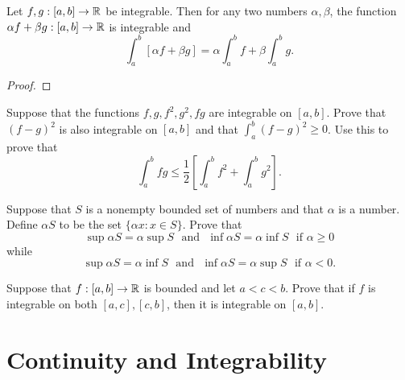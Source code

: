 \documentclass[letterpaper, twoside, 12pt]{book}
\begin{document}
\begin{theorem}
  Let \(f,g:[a,b]\to\mathbb R\) be integrable. Then for any two numbers
  \(\alpha,\beta\), the function \(\alpha f+\beta g:[a,b]\to\mathbb R\) is
  integrable and
  \[
    \int_a^b[\alpha f+\beta g]=\alpha\int_a^b f + \beta\int_a^b g
  .\]
\end{theorem}
\begin{proof}

\end{proof}


\begin{exercise}[1]
  Suppose that the functions \(f,g,f^2,g^2,fg\) are integrable on \([a,b]\).
  Prove that \((f-g)^2\) is also integrable on \([a,b]\) and that
  \(\int_a^b(f-g)^2\geq0\). Use this to prove that
  \[
    \int_a^b fg
      \leq
    \frac{1}{2}\left[
      \int_a^b f^2 + \int_a^b g^2
    \right]
  .\]
\end{exercise}
\begin{solution}

\end{solution}

\begin{exercise}[4]
  Suppose that \(S\) is a nonempty bounded set of numbers and that \(\alpha\)
  is a number. Define \(\alpha S\) to be the set \(\{\alpha x:x\in S\}\).
  Prove that
  \[
    \sup\alpha S=\alpha\sup S
      \text{~~and~~}
    \inf\alpha S=\alpha\inf S
      \text{~~if~}
    \alpha\geq 0
  \]
  while
  \[
    \sup\alpha S=\alpha\inf S
      \text{~~and~~}
    \inf\alpha S=\alpha\sup S
      \text{~~if~}
    \alpha< 0
  .\]
\end{exercise}
\begin{solution}

\end{solution}


\begin{exercise}[6]
  Suppose that \(f:[a,b]\to\mathbb R\) is bounded and let \(a<c<b\). Prove that if
  \(f\) is integrable on both \([a,c],[c,b]\), then it is integrable on
  \([a,b]\).
\end{exercise}
\begin{solution}

\end{solution}




\section{Continuity and Integrability}
\end{document}
